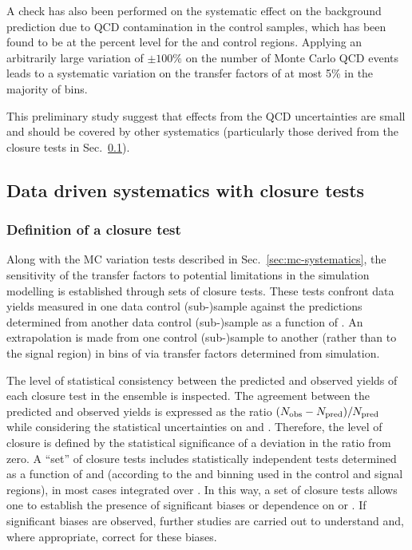 A check has also been performed on the systematic effect on the
background prediction due to QCD contamination in the control samples,
which has been found to be at the percent level for the \mj and \gj
control regions. Applying an arbitrarily large variation of $\pm
100\%$ on the number of Monte Carlo QCD events leads to a systematic
variation on the transfer factors of at most 5\% in the majority of
bins.

This preliminary study suggest that effects from the QCD
uncertainties are small and should be covered by other systematics
(particularly those derived from the closure tests in
Sec.~\ref{sec:closure-tests}).



\subsection{Data driven systematics with closure tests}
\label{sec:closure-tests}

\subsubsection{Definition of a closure test}
\label{sec:closure-tests-desc}

Along with the MC variation tests described in Sec.~\ref{sec:mc-systematics}, 
the sensitivity of the transfer factors to potential limitations in
the simulation modelling is established through sets of closure tests.
These tests confront data yields measured in one data control (sub-)sample
against the predictions determined from another data control
(sub-)sample as a function of \scalht. An extrapolation is made
from one control (sub-)sample to another (rather than to the signal
region) in bins of \scalht via transfer factors determined from
simulation. 

The level of statistical consistency between the predicted and
observed yields of each closure test in the ensemble is inspected. The
agreement between the predicted and observed yields is
expressed as the ratio $(\nobs - \npre)/\npre$ while considering 
the statistical uncertainties on \npre and \nobs. Therefore, the level
of closure is defined by the statistical significance of a deviation
in the ratio from zero. A ``set'' of closure tests includes
statistically independent tests determined as a function of \scalht
and \njet (according to the \scalht and \njet binning used in the control and signal
regions), in most cases integrated over \nb. In this way, a set of closure 
tests allows one to establish
the presence of significant biases or dependence on
\scalht or \njet. If significant biases are
observed, further studies are carried out to understand and, where
appropriate, correct for
these biases. 

